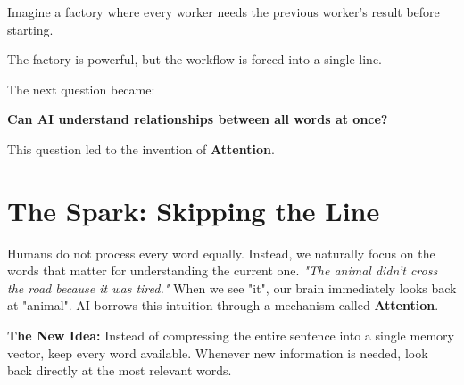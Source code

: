 \documentclass[11pt]{article}
\begin{document}
\vspace{0.15in}

Imagine a factory where every worker needs the previous worker's result before starting.

The factory is powerful, but the workflow is forced into a single line.

\vspace{0.15in}

The next question became:

\begin{center}
\textbf{
Can AI understand relationships between all words at once?
}
\end{center}

This question led to the invention of \textbf{Attention}.

\newpage


\section*{The Spark: Skipping the Line}

\vspace{0.02in}

Humans do not process every word equally. Instead, we naturally focus on the words that matter for understanding the current one. \textit{"The animal didn't cross the road because it was tired."} When we see "it", our brain immediately looks back at "animal". AI borrows this intuition through a mechanism called \textbf{Attention}.

\vspace{0.05in}

\textbf{The New Idea:} Instead of compressing the entire sentence into a single memory vector, keep every word available. Whenever new information is needed, look back directly at the most relevant words.

\vspace{0.05in}

\begin{center}
\end{center}
\end{document}
